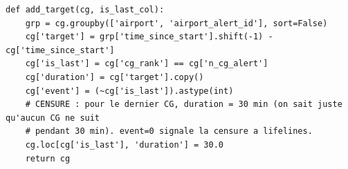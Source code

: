 \documentclass[11pt,a4paper]{article}
\begin{document}
\begin{lstlisting}[caption={Construction de duration et event pour la censure (cle).}]
def add_target(cg, is_last_col):
    grp = cg.groupby(['airport', 'airport_alert_id'], sort=False)
    cg['target'] = grp['time_since_start'].shift(-1) - cg['time_since_start']
    cg['is_last'] = cg['cg_rank'] == cg['n_cg_alert']
    cg['duration'] = cg['target'].copy()
    cg['event'] = (~cg['is_last']).astype(int)
    # CENSURE : pour le dernier CG, duration = 30 min (on sait juste qu'aucun CG ne suit
    # pendant 30 min). event=0 signale la censure a lifelines.
    cg.loc[cg['is_last'], 'duration'] = 30.0
    return cg
\end{lstlisting}
\end{document}
